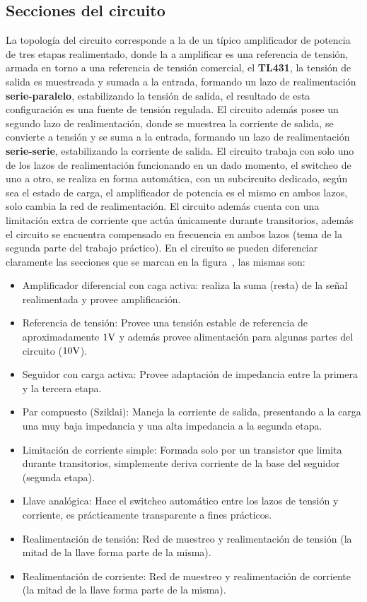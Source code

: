 
\subsection{Secciones del circuito}


\normalfont

La topología del circuito corresponde a la de un típico amplificador de potencia de tres etapas realimentado, donde la  a amplificar es una referencia de tensión, armada en torno a una referencia de tensión comercial, el \textbf{TL431}, la tensión de salida es muestreada y sumada a la entrada, formando un lazo de realimentación \textbf{serie-paralelo}, estabilizando la tensión de salida, el resultado de esta configuración es una fuente de tensión regulada. El circuito además posee un segundo lazo de realimentación, donde se muestrea la corriente de salida, se convierte a tensión y se suma a la entrada, formando un lazo de realimentación \textbf{serie-serie}, estabilizando la corriente de salida. El circuito trabaja con solo uno de los lazos de realimentación funcionando en un dado momento, el switcheo de uno a otro, se realiza en forma automática, con un subcircuito dedicado, según sea el estado de carga, el amplificador de potencia es el mismo en ambos lazos, solo cambia la red de realimentación. El circuito además cuenta con una limitación extra de corriente que actúa únicamente durante transitorios, además el circuito se encuentra compensado en frecuencia en ambos lazos (tema de la segunda parte del trabajo práctico).
En el circuito se pueden diferenciar claramente las secciones que se marcan en la figura~, las mismas son:


\begin{itemize}
\item Amplificador diferencial con caga activa: realiza la suma (resta) de la señal realimentada y provee amplificación.
\item Referencia de tensión: Provee una tensión estable de referencia de aproximadamente $1 \si[per-mode=symbol]{\volt}$ y además provee alimentación para algunas partes del circuito ($10 \si[per-mode=symbol]{\volt}$).
\item Seguidor con carga activa: Provee adaptación de impedancia entre la primera y la tercera etapa.
\item Par compuesto (Sziklai): Maneja la corriente de salida, presentando a la carga una muy baja impedancia y una alta impedancia a la segunda etapa.
\item Limitación de corriente simple: Formada solo por un transistor que limita durante transitorios, simplemente deriva corriente de la base del seguidor (segunda etapa).
\item Llave analógica: Hace el switcheo automático entre los lazos de tensión y corriente, es prácticamente transparente a fines prácticos.
\item Realimentación de tensión: Red de muestreo y realimentación de tensión (la mitad de la llave forma parte de la misma).
\item Realimentación de corriente: Red de muestreo y realimentación de corriente (la mitad de la llave forma parte de la misma).
\end{itemize}

